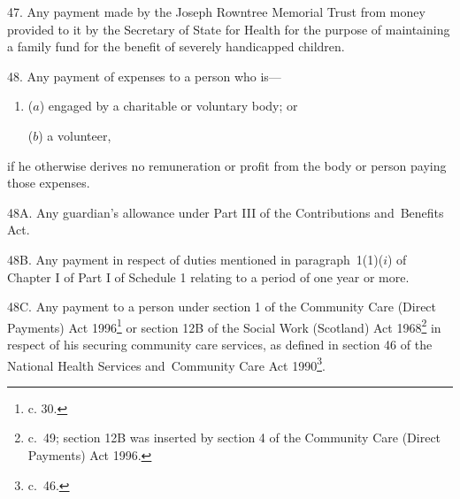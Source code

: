 \documentclass[12pt,a4paper]{article}
\begin{document}
\medskip

47.  Any payment made by the Joseph Rowntree Memorial Trust from money provided to it by the Secretary of State for Health for the purpose of maintaining a family fund for the benefit of severely handicapped children.

\medskip

48.  Any payment of expenses to a person who is—
\begin{enumerate}\item[]
($a$) engaged by a charitable or voluntary body; or

($b$) a volunteer,
\end{enumerate}
if he otherwise derives no remuneration or profit from the body or person paying those expenses.

\medskip


48A.  Any guardian’s allowance under Part III of the Contributions and~Benefits Act. 


\medskip

48B. Any payment in respect of duties mentioned in paragraph~1(1)($i$) of Chapter I of Part I of Schedule 1 relating to a period of one year or more.


\medskip

48C.  Any payment to a person under section 1 of the Community Care (Direct Payments) Act 1996\footnote{ c. 30.} or section 12B of the Social Work (Scotland) Act 1968\footnote{ c.~49; section 12B was inserted by section 4 of the Community Care (Direct Payments) Act 1996.} in respect of his securing community care services, as defined in section 46 of the National Health Services and~Community Care Act 1990\footnote{ c.~46.}.

\end{document}
